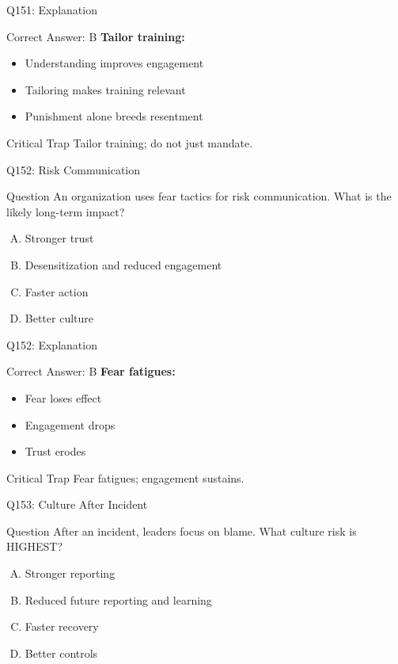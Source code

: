 \documentclass{beamer}
\begin{document}
	\begin{frame}{Q151: Explanation}
		\begin{block}{Correct Answer: B}
			\textbf{Tailor training:}
			\begin{itemize}
				\item Understanding improves engagement
				\item Tailoring makes training relevant
				\item Punishment alone breeds resentment
			\end{itemize}
		\end{block}
		\begin{alertblock}{Critical Trap}
			Tailor training; do not just mandate.
		\end{alertblock}
	\end{frame}
	
	\begin{frame}{Q152: Risk Communication}
		\begin{block}{Question}
			An organization uses fear tactics for risk communication. What is the likely long-term impact?
		\end{block}
		\begin{enumerate}[(A)]
			\item Stronger trust
			\item Desensitization and reduced engagement
			\item Faster action
			\item Better culture
		\end{enumerate}
	\end{frame}
	
	\begin{frame}{Q152: Explanation}
		\begin{block}{Correct Answer: B}
			\textbf{Fear fatigues:}
			\begin{itemize}
				\item Fear loses effect
				\item Engagement drops
				\item Trust erodes
			\end{itemize}
		\end{block}
		\begin{alertblock}{Critical Trap}
			Fear fatigues; engagement sustains.
		\end{alertblock}
	\end{frame}
	
	\begin{frame}{Q153: Culture After Incident}
		\begin{block}{Question}
			After an incident, leaders focus on blame. What culture risk is HIGHEST?
		\end{block}
		\begin{enumerate}[(A)]
			\item Stronger reporting
			\item Reduced future reporting and learning
			\item Faster recovery
			\item Better controls
		\end{enumerate}
	\end{frame}
	
\end{document}
